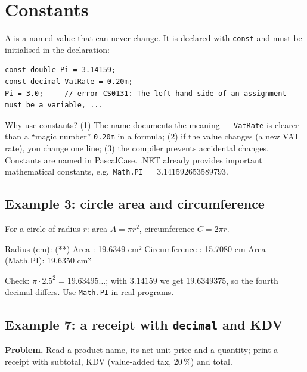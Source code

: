 \section{Constants}\label{sec:constants}
A  is a named value that can never change. It is declared with \texttt{const} and must be initialised in the declaration:
\begin{lstlisting}[numbers=none]
const double Pi = 3.14159;
const decimal VatRate = 0.20m;
Pi = 3.0;     // error CS0131: The left-hand side of an assignment must be a variable, ...
\end{lstlisting}
Why use constants? (1) The name documents the meaning --- \texttt{VatRate} is clearer than a ``magic number'' \texttt{0.20m} in a formula; (2) if the value changes (a new VAT rate), you change one line; (3) the compiler prevents accidental changes. Constants are named in PascalCase. .NET already provides important mathematical constants, e.g.\ \texttt{Math.PI} $= 3.141592653589793$.

\subsection{Example 3: circle area and circumference}
For a circle of radius $r$: area $A = \pi r^2$, circumference $C = 2\pi r$.

\begin{consolebox}
\begin{run}
Radius (cm): (**)
Area          : 19.6349 cm²
Circumference : 15.7080 cm
Area (Math.PI): 19.6350 cm²
\end{run}
\end{consolebox}
Check: $\pi \cdot 2.5^2 = 19.63495\ldots$; with $3.14159$ we get $19.6349375$, so the fourth decimal differs. Use \texttt{Math.PI} in real programs.

\subsection{Example 7: a receipt with \texttt{decimal} and KDV}
\textbf{Problem.} Read a product name, its net unit price and a quantity; print a receipt with subtotal, KDV (value-added tax, 20\,\%) and total.

